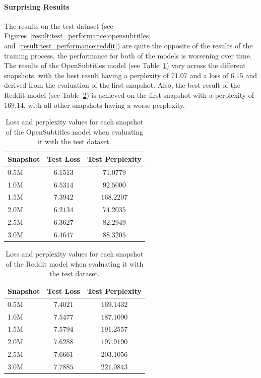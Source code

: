 \paragraph{Surprising Results} The results on the test dataset (see Figures~\ref{result:test_performance:opensubtitles} and~\ref{result:test_performance:reddit}) are quite the opposite of the results of the training process, the performance for both of the models is
worsening over time. The results of the OpenSubtitles model (see Table~\ref{results:test_metrics:opensubtitles}) vary across the different snapshots, with the best result having a perplexity of $71.07$ and a loss of $6.15$ and derived from the evaluation of the first snapshot. Also, the best result of the Reddit model (see Table~\ref{results:test_metrics:reddit}) is achieved on the first snapshot with a perplexity of $169.14$, with all other snapshots having a worse perplexity.
\\
\begin{table}[H]
	\centering
	\begin{adjustbox}{max width=\textwidth}
		\begin{tabular}{l|cc}
			\toprule
			Snapshot & Test Loss & Test Perplexity\\
			\midrule
			0.5M & $6.1513$ & $71.0779$\\
			1.0M & $6.5314$ & $92.5000$\\
			1.5M & $7.3942$ & $168.2207$\\
			2.0M & $6.2134$ & $74.2035$\\
			2.5M & $6.3627$ & $82.2949$\\
			3.0M & $6.4647$ & $88.3205$\\
			\bottomrule
		\end{tabular}
	\end{adjustbox}
	\caption{Loss and perplexity values for each snapshot of the OpenSubtitles model when evaluating it with the test dataset.}
	\label{results:test_metrics:opensubtitles}
\end{table}

\begin{table}[H]
	\centering
	\begin{adjustbox}{max width=\textwidth}
		\begin{tabular}{l|cc}
			\toprule
			Snapshot & Test Loss & Test Perplexity\\
			\midrule
			0.5M & $7.4021$ & $169.1432$\\
			1.0M & $7.5477$ & $187.1090$\\
			1.5M & $7.5794$ & $191.2557$\\
			2.0M & $7.6288$ & $197.9190$\\
			2.5M & $7.6661$ & $203.1056$\\
			3.0M & $7.7885$ & $221.0843$\\
			\bottomrule
		\end{tabular}
	\end{adjustbox}
	\caption{Loss and perplexity values for each snapshot of the Reddit model when evaluating it with the test dataset.}
	\label{results:test_metrics:reddit}
\end{table}

